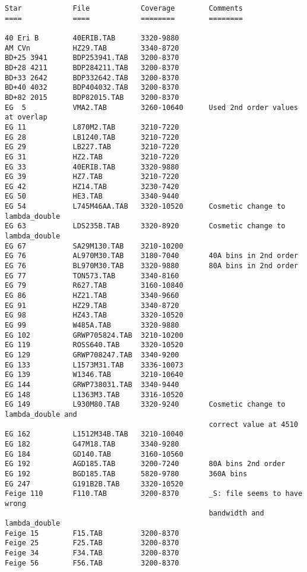 \goodbreak
\begin{verbatim}
Star            File            Coverage        Comments
====            ====            ========        ========

40 Eri B        40ERIB.TAB      3320-9880
AM CVn          HZ29.TAB        3340-8720
BD+25 3941      BDP253941.TAB   3200-8370
BD+28 4211      BDP284211.TAB   3200-8370
BD+33 2642      BDP332642.TAB   3200-8370
BD+40 4032      BDP404032.TAB   3200-8370
BD+82 2015      BDP82015.TAB    3200-8370
EG  5           VMA2.TAB        3260-10640      Used 2nd order values at overlap
EG 11           L870M2.TAB      3210-7220
EG 28           LB1240.TAB      3210-7220
EG 29           LB227.TAB       3210-7220
EG 31           HZ2.TAB         3210-7220
EG 33           40ERIB.TAB      3320-9880
EG 39           HZ7.TAB         3210-7220
EG 42           HZ14.TAB        3230-7420
EG 50           HE3.TAB         3340-9440
EG 54           L745M46AA.TAB   3320-10520      Cosmetic change to lambda_double
EG 63           LDS235B.TAB     3320-8920       Cosmetic change to lambda_double
EG 67           SA29M130.TAB    3210-10200
EG 76           AL970M30.TAB    3180-7040       40A bins in 2nd order
EG 76           BL970M30.TAB    3320-9880       80A bins in 2nd order
EG 77           TON573.TAB      3340-8160
EG 79           R627.TAB        3160-10840
EG 86           HZ21.TAB        3340-9660
EG 91           HZ29.TAB        3340-8720
EG 98           HZ43.TAB        3320-10520
EG 99           W485A.TAB       3320-9880
EG 102          GRWP705824.TAB  3210-10200
EG 119          ROSS640.TAB     3320-10520
EG 129          GRWP708247.TAB  3340-9200
EG 133          L1573M31.TAB    3336-10073
EG 139          W1346.TAB       3210-10640
EG 144          GRWP738031.TAB  3340-9440
EG 148          L1363M3.TAB     3316-10520
EG 149          L930M80.TAB     3320-9240       Cosmetic change to lambda_double and 
                                                correct value at 4510
EG 162          L1512M34B.TAB   3210-10040
EG 182          G47M18.TAB      3340-9280
EG 184          GD140.TAB       3160-10560
EG 192          AGD185.TAB      3200-7240       80A bins 2nd order
EG 192          BGD185.TAB      5820-9780       360A bins
EG 247          G191B2B.TAB     3320-10520
Feige 110       F110.TAB        3200-8370       _S: file seems to have wrong
                                                bandwidth and lambda_double
Feige 15        F15.TAB         3200-8370
Feige 25        F25.TAB         3200-8370
Feige 34        F34.TAB         3200-8370
Feige 56        F56.TAB         3200-8370

\end{verbatim}
